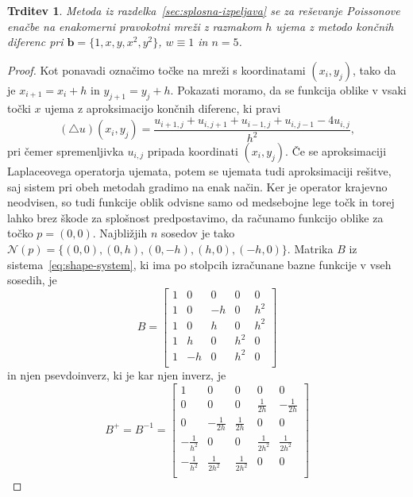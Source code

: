 \documentclass[12pt,a4paper,twoside]{article}
\theoremstyle{definition} %
\theoremstyle{plain} %
\newtheorem{trditev}[definicija]{Trditev}
\numberwithin{equation}{section}
\newcommand{\Nc}{\mathcal{N}}
\newcommand{\lap}{\triangle}
\renewcommand{\b}{\boldsymbol}
\begin{document}
\begin{trditev}
  \label{trd:eq-to-fdm}
  Metoda iz razdelka~\ref{sec:splosna-izpeljava} se za reševanje Poissonove
  enačbe na enakomerni pravokotni mreži z razmakom $h$ ujema z metodo končnih
  diferenc pri $\b{b} = \{1, x, y, x^2, y^2\}$, $w \equiv 1$ in
  $n=5$.
\end{trditev}
\begin{proof}
Kot ponavadi označimo točke na mreži s koordinatami $(x_i, y_j)$, tako da je
$x_{i+1} = x_i + h$ in $y_{j+1} = y_j + h$.
Pokazati moramo, da se funkcija oblike v vsaki točki $x$ ujema z aproksimacijo končnih diferenc, ki
pravi
\begin{equation}
  (\lap u)(x_i, y_j) = \frac{u_{i+1,j} + u_{i, j+1} + u_{i-1,j} + u_{i, j-1} - 4u_{i,j}}{h^2},
\end{equation}
pri čemer spremenljivka $u_{i, j}$ pripada koordinati $(x_i, y_j)$. Če se
aproksimaciji Laplaceovega operatorja ujemata, potem se ujemata tudi
aproksimaciji rešitve, saj sistem pri obeh metodah gradimo na enak način.
Ker je operator krajevno neodvisen, so tudi funkcije oblik odvisne samo od
medsebojne lege točk in torej lahko brez škode
za splošnost predpostavimo, da računamo funkcijo oblike za točko
$p = (0, 0)$. Najbližjih $n$ sosedov je tako $\Nc(p) = \{(0, 0), (0, h), (0, -h),
(h, 0), (-h, 0)\}$. Matrika $B$ iz sistema~\eqref{eq:shape-system},
ki ima po stolpcih izračunane bazne funkcije v vseh sosedih, je
\begin{equation}
  \label{eq:fdm-special-case-start}
  B =
  \begin{bmatrix}
    1 & 0 & 0 & 0 & 0 \\
    1 & 0 & -h & 0 & h^2 \\
    1 & 0 & h & 0 & h^2 \\
    1 & h & 0 & h^2 & 0 \\
    1 & -h & 0 & h^2 & 0 \\
  \end{bmatrix}
\end{equation}
in njen psevdoinverz, ki je kar njen inverz, je
\begin{equation}
  B^+ = B^{-1} =
  \begin{bmatrix}
     1 & 0 & 0 & 0 & 0 \\
 0 & 0 & 0 & \frac{1}{2 h} & -\frac{1}{2 h} \\
 0 & -\frac{1}{2 h} & \frac{1}{2 h} & 0 & 0 \\
 -\frac{1}{h^2} & 0 & 0 & \frac{1}{2 h^2} & \frac{1}{2 h^2} \\
 -\frac{1}{h^2} & \frac{1}{2 h^2} & \frac{1}{2 h^2} & 0 & 0 \\

\end{bmatrix}
\end{equation}
\end{proof}
\end{document}
